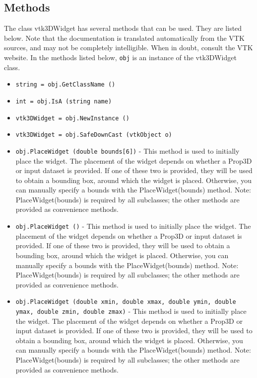 \subsection{Methods}

The class vtk3DWidget has several methods that can be used.
  They are listed below.
Note that the documentation is translated automatically from the VTK sources,
and may not be completely intelligible.  When in doubt, consult the VTK website.
In the methods listed below, \verb|obj| is an instance of the vtk3DWidget class.
\begin{itemize}
\item  \verb|string = obj.GetClassName ()|

\item  \verb|int = obj.IsA (string name)|

\item  \verb|vtk3DWidget = obj.NewInstance ()|

\item  \verb|vtk3DWidget = obj.SafeDownCast (vtkObject o)|

\item  \verb|obj.PlaceWidget (double bounds[6])| -  This method is used to initially place the widget.  The placement of the
 widget depends on whether a Prop3D or input dataset is provided. If one
 of these two is provided, they will be used to obtain a bounding box,
 around which the widget is placed. Otherwise, you can manually specify a
 bounds with the PlaceWidget(bounds) method. Note: PlaceWidget(bounds)
 is required by all subclasses; the other methods are provided as
 convenience methods.

\item  \verb|obj.PlaceWidget ()| -  This method is used to initially place the widget.  The placement of the
 widget depends on whether a Prop3D or input dataset is provided. If one
 of these two is provided, they will be used to obtain a bounding box,
 around which the widget is placed. Otherwise, you can manually specify a
 bounds with the PlaceWidget(bounds) method. Note: PlaceWidget(bounds)
 is required by all subclasses; the other methods are provided as
 convenience methods.

\item  \verb|obj.PlaceWidget (double xmin, double xmax, double ymin, double ymax, double zmin, double zmax)| -  This method is used to initially place the widget.  The placement of the
 widget depends on whether a Prop3D or input dataset is provided. If one
 of these two is provided, they will be used to obtain a bounding box,
 around which the widget is placed. Otherwise, you can manually specify a
 bounds with the PlaceWidget(bounds) method. Note: PlaceWidget(bounds)
 is required by all subclasses; the other methods are provided as
 convenience methods.


\end{itemize}
